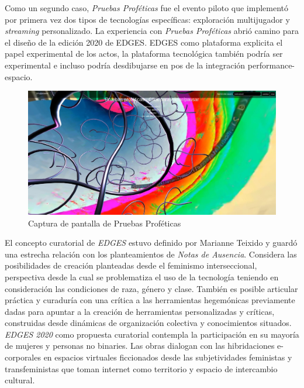 Como un segundo caso, \textit{Pruebas Proféticas} fue el evento piloto que implementó por primera vez dos tipos de tecnologías específicas: exploración multijugador y \textit{streaming} personalizado. La experiencia con \textit{Pruebas Proféticas} abrió camino para el diseño de la edición 2020 de EDGES.  EDGES como plataforma explicita el papel experimental de los actos, la plataforma tecnológica también podría ser experimental e incluso podría desdibujarse en pos de la integración performance-espacio.


\begin{figure}
  \includegraphics[width=\textwidth]{img/pruebas.jpg}
  \caption{Captura de pantalla de Pruebas Proféticas}
\end{figure}

El concepto curatorial de \textit{EDGES} estuvo definido por Marianne Teixido y guardó una estrecha relación con los planteamientos de \textit{Notas de Ausencia}. Considera las posibilidades de creación planteadas desde el feminismo interseccional, perspectiva desde la cual se problematiza el uso de la tecnología teniendo en consideración las condiciones de raza, género y clase. También es posible articular práctica y curaduría con una crítica a las herramientas hegemónicas previamente dadas para apuntar a la creación de herramientas personalizadas y críticas, construidas desde dinámicas de organización colectiva y conocimientos situados. \textit{EDGES 2020} como propuesta curatorial contempla la participación en su mayoría de mujeres y personas no binaries. Las obras dialogan con las hibridaciones e-corporales en espacios virtuales ficcionados desde las subjetividades feministas y transfeministas que toman internet como territorio y espacio de intercambio cultural.


